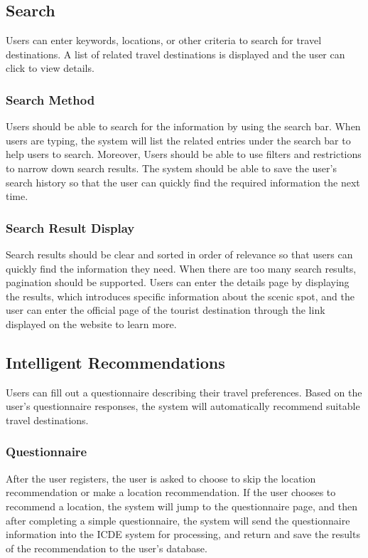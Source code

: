 \documentclass[conference]{IEEEtran}
\begin{document}
\subsection{ Search }

Users can enter keywords, locations, or other criteria to search for travel 
destinations.
A list of related travel destinations is displayed and the user can click to view 
details.

\subsubsection{ Search Method }

Users should be able to search for the information by using the search 
bar. When users are typing, the system will list the related entries under the 
search bar to help users to search. Moreover, Users should be able to use 
filters and restrictions to narrow down search results. The system should be 
able to save the user's search history so that the user can quickly find the 
required information the next time.

\subsubsection{ Search Result Display }

Search results should be clear and sorted in order of relevance so that 
users can quickly find the information they need. When there are too many 
search results, pagination should be supported. Users can enter the details 
page by displaying the results, which introduces specific information about 
the scenic spot, and the user can enter the official page of the tourist 
destination through the link displayed on the website to learn more.

\subsection{ Intelligent Recommendations }

Users can fill out a questionnaire describing their travel preferences.
Based on the user's questionnaire responses, the system will automatically 
recommend suitable travel destinations.

\subsubsection{ Questionnaire }

After the user registers, the user is asked to choose to skip the location 
recommendation or make a location recommendation. If the user chooses 
to recommend a location, the system will jump to the questionnaire page, 
and then after completing a simple questionnaire, the system will send the 
questionnaire information into the ICDE system for processing, and return 
and save the results of the recommendation to the user's database.
\end{document}
